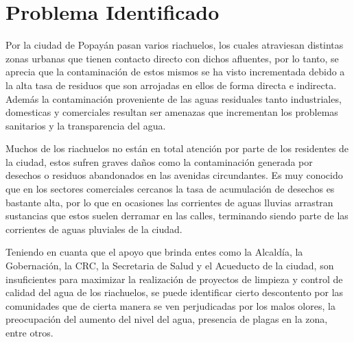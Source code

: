 \section{Problema Identificado}
Por la ciudad de Popayán pasan varios riachuelos, los cuales atraviesan distintas zonas urbanas que tienen contacto directo con dichos afluentes, por lo tanto, se aprecia que la contaminación de estos mismos se ha visto incrementada debido a la alta tasa de residuos que son arrojadas en ellos de forma directa e indirecta. Además la contaminación proveniente de las aguas residuales tanto industriales, domesticas y comerciales resultan ser amenazas que incrementan los problemas sanitarios y la transparencia del agua.

Muchos de los riachuelos no están en total atención por parte de los residentes de la ciudad, estos sufren graves daños como la contaminación generada por desechos o residuos abandonados en las avenidas circundantes. Es muy conocido que en los sectores comerciales cercanos la tasa de acumulación de desechos es bastante alta, por lo que en ocasiones las corrientes de aguas lluvias arrastran sustancias que estos suelen derramar en las calles, terminando siendo parte de las corrientes de aguas pluviales de la ciudad.

Teniendo en cuanta que el apoyo que brinda entes como la Alcaldía, la Gobernación, la CRC, la Secretaria de Salud y el Acueducto de la ciudad, son insuficientes para maximizar la realización de proyectos de limpieza y control de calidad del agua de los riachuelos, se puede identificar cierto descontento por las comunidades que de cierta manera se ven perjudicadas por los malos olores, la preocupación del aumento del nivel del agua, presencia de plagas en la zona, entre otros.
